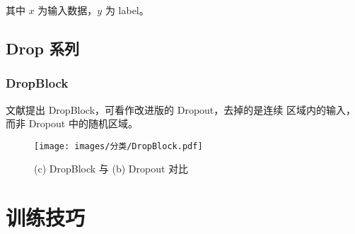 其中 $x$ 为输入数据，$y$ 为 label。

\subsection{Drop 系列}
\subsubsection{DropBlock}
文献提出 DropBlock，可看作改进版的 Dropout，去掉的是连续
区域内的输入，而非 Dropout 中的随机区域。

\begin{figure}[ht]
  \centering
  \texttt{[image: images/分类/DropBlock.pdf]}
  \caption{(c) DropBlock 与 (b) Dropout 对比}\label{fig:dropblock}
\end{figure}

\section{训练技巧}


